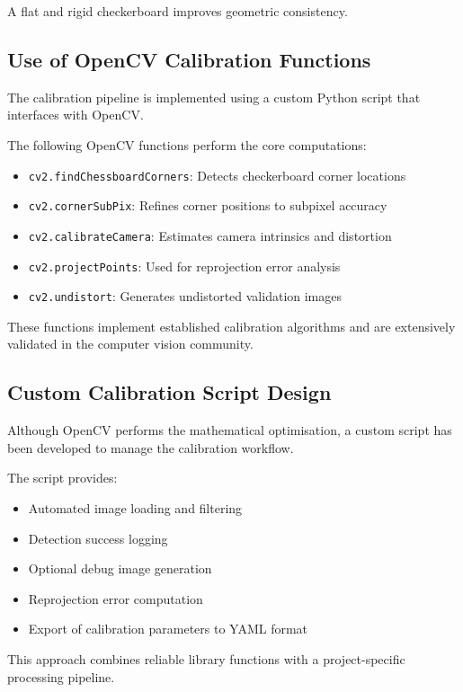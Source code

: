 \documentclass[11pt,a4paper]{article}
\begin{document}
A flat and rigid checkerboard improves geometric consistency.

\subsection{Use of OpenCV Calibration Functions}

The calibration pipeline is implemented using a custom Python script that interfaces with OpenCV.

The following OpenCV functions perform the core computations:

\begin{itemize}
  \item \texttt{cv2.findChessboardCorners}: Detects checkerboard corner locations
  \item \texttt{cv2.cornerSubPix}: Refines corner positions to subpixel accuracy
  \item \texttt{cv2.calibrateCamera}: Estimates camera intrinsics and distortion
  \item \texttt{cv2.projectPoints}: Used for reprojection error analysis
  \item \texttt{cv2.undistort}: Generates undistorted validation images
\end{itemize}

These functions implement established calibration algorithms and are extensively validated in the computer vision community.

\subsection{Custom Calibration Script Design}

Although OpenCV performs the mathematical optimisation, a custom script has been developed to manage the calibration workflow.

The script provides:

\begin{itemize}
  \item Automated image loading and filtering
  \item Detection success logging
  \item Optional debug image generation
  \item Reprojection error computation
  \item Export of calibration parameters to YAML format
\end{itemize}

This approach combines reliable library functions with a project-specific processing pipeline.
\end{document}
